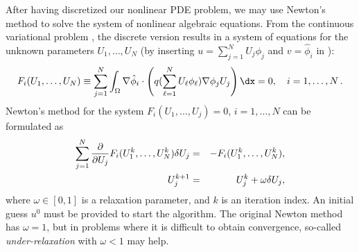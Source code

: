 After having discretized our nonlinear PDE problem, we may
use Newton's method to solve the system of nonlinear algebraic equations.
From the continuous variational problem ,
the discrete version  results in a
system of equations for the unknown parameters $U_1,\ldots, U_N$
(by inserting $u = \sum_{j=1}^N U_j \phi_j$
and $v=\hat\phi_i$ in ):
\begin{equation}
\label{langtangen:nonlinear:Newton:F1}
F_i(U_1,\ldots,U_N) \equiv
\sum_{j=1}^N
\int_\Omega \nabla \hat\phi_i\cdot\left( q(\sum_{\ell=1}^NU_\ell\phi_\ell)
\nabla \phi_j U_j\right)\dx = 0,\quad i=1,\ldots,N\langtangenep
\end{equation}
Newton's method for the system $F_i(U_1,\ldots,U_j)=0$, $i=1,\ldots,N$
can be formulated as
\begin{eqnarray}
\sum_{j=1}^N
{\partial \over\partial U_j} F_i(U_1^k,\ldots,U_N^k)\delta U_j
&=& -F_i(U_1^k,\ldots,U_N^k),\\
U_j^{k+1} &=& U_j^k + \omega\delta U_j,
\end{eqnarray}
where $\omega\in [0,1]$ is a relaxation parameter, and $k$ is
an iteration index. An initial guess $u^0$ must
be provided to start the algorithm.
The original Newton method has $\omega=1$, but in problems where it is
difficult to obtain convergence, so-called \emph{under-relaxation} with $\omega < 1$ may help.

